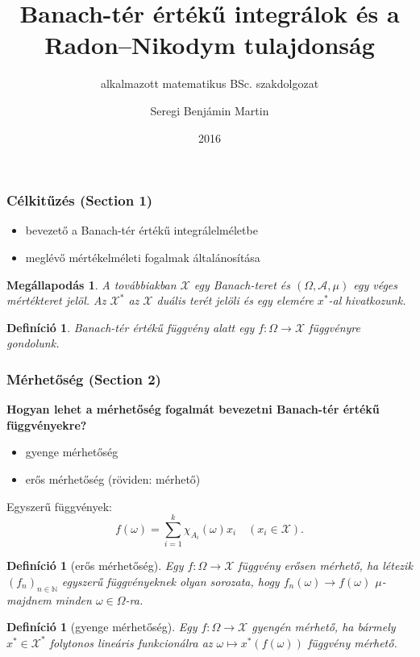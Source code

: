 \documentclass{beamer} %
\title{Banach-tér értékű integrálok és a Radon\---Nikodym tulajdonság}
\subtitle{alkalmazott matematikus BSc. szakdolgozat}
\author{Seregi Benjámin Martin}
\institute{Eötvös Loránd Tudományegyetem}
\date{2016}
\newtheorem{defi}[lem]{Definíció}
\newtheorem{megall}[lem]{Megállapodás}
\begin{document}
\frame{\titlepage}
\begin{frame}
\frametitle{Célkitűzés (Section 1)}
\justifying
\begin{itemize}
\item bevezető a Banach-tér értékű integrálelméletbe
\pause \item meglévő mértékelméleti fogalmak általánosítása
\end{itemize}
\pause \begin{megall}
A továbbiakban $\mathcal{X}$ egy Banach-teret és $(\Omega, \mathcal{A}, \mu)$ egy véges mértékteret jelöl. Az $\mathcal{X}^*$ az $\mathcal{X}$ duális terét jelöli és egy elemére $x^*$-al hivatkozunk.
\end{megall}
\pause \begin{defi}
Banach-tér értékű függvény alatt egy  $f \colon \Omega \to \mathcal{X}$ függvényre gondolunk.
\end{defi}
\end{frame}

\begin{frame}
\frametitle{Mérhetőség (Section 2)}
\justifying
\textbf{Hogyan lehet a mérhetőség fogalmát bevezetni Banach-tér értékű függvényekre?}
\begin{itemize}
\pause \item gyenge mérhetőség
\pause \item erős mérhetőség (röviden: mérhető)
\end{itemize}
\end{frame}

\begin{frame}
Egyszerű függvények:
$$f(\omega) = \sum^k_{i=1} \chi_{A_i}(\omega)x_i \quad (x_i \in \mathcal{X}).$$
\pause \begin{defi}[erős mérhetőség] Egy $f \colon \Omega \to \mathcal{X}$ függvény erősen mérhető, ha létezik $(f_n)_{n \in \mathbb{N}}$ egyszerű függvényeknek olyan sorozata, hogy $f_n(\omega) \to f(\omega)$ $\mu$-majdnem minden $\omega \in \Omega$-ra.
\end{defi}
\pause\begin{defi}[gyenge mérhetőség] Egy $f \colon \Omega \to \mathcal{X}$ gyengén mérhető, ha bármely $x^* \in \mathcal{X}^*$ folytonos lineáris funkcionálra az $\omega \mapsto x^*(f(\omega))$ függvény mérhető.
\end{defi}
\end{frame}
\end{document}
